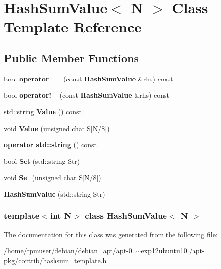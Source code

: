 \section{\-Hash\-Sum\-Value$<$ \-N $>$ \-Class \-Template \-Reference}
\label{classHashSumValue}
\subsection*{\-Public \-Member \-Functions}
\begin{DoxyCompactItemize}
\item 
bool {\bfseries operator==} (const {\bf \-Hash\-Sum\-Value} \&rhs) const \label{classHashSumValue_acc53bf310691d1465f99d55e38a7544a}

\item 
bool {\bfseries operator!=} (const {\bf \-Hash\-Sum\-Value} \&rhs) const \label{classHashSumValue_a32262933bd5caaaedab3bb18dfe1a599}

\item 
std\-::string {\bfseries \-Value} () const \label{classHashSumValue_aab3988c46d5e453bb99946c81531e587}

\item 
void {\bfseries \-Value} (unsigned char \-S[\-N/8])\label{classHashSumValue_a9f0c6a7b6a95f62483ece1891a19c60d}

\item 
{\bfseries operator std\-::string} () const \label{classHashSumValue_a7d27cc515e59f676f08d399124be099d}

\item 
bool {\bfseries \-Set} (std\-::string \-Str)\label{classHashSumValue_ad6624cd99d9334e1d450ed4f8e2fb6c7}

\item 
void {\bfseries \-Set} (unsigned char \-S[\-N/8])\label{classHashSumValue_a367736f262d87756778eeb9ceac9cf76}

\item 
{\bfseries \-Hash\-Sum\-Value} (std\-::string \-Str)\label{classHashSumValue_a556ecad58ded0b16d6eb28d545b5377a}

\end{DoxyCompactItemize}
\subsubsection*{template$<$int \-N$>$ class Hash\-Sum\-Value$<$ N $>$}



\-The documentation for this class was generated from the following file\-:\begin{DoxyCompactItemize}
\item 
/home/rpmuser/debian/debian\-\_\-apt/apt-\/0..$\sim$exp12ubuntu10./apt-\/pkg/contrib/hashsum\-\_\-template.\-h\end{DoxyCompactItemize}

